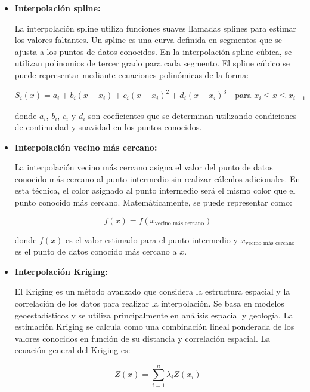 \documentclass{article}
\begin{document}
\begin{itemize}
\begin{itemize}
\item   \textbf{Interpolación spline:}

La interpolación spline utiliza funciones suaves llamadas splines para estimar los valores faltantes. Un spline es una curva definida en segmentos que se ajusta a los puntos de datos conocidos. En la interpolación spline cúbica, se utilizan polinomios de tercer grado para cada segmento. El spline cúbico se puede representar mediante ecuaciones polinómicas de la forma:

\begin{equation}
    S_i(x) = a_i + b_i(x - x_i) + c_i(x - x_i)^2 + d_i(x - x_i)^3 \quad \textrm{para } x_i \leq x \leq x_{i+1}
\end{equation}

donde $a_i$, $b_i$, $c_i$ y $d_i$ son coeficientes que se determinan utilizando condiciones de continuidad y suavidad en los puntos conocidos.

\item  \textbf{ Interpolación vecino más cercano:}

La interpolación vecino más cercano asigna el valor del punto de datos conocido más cercano al punto intermedio sin realizar cálculos adicionales. En esta técnica, el color asignado al punto intermedio será el mismo color que el punto conocido más cercano. Matemáticamente, se puede representar como:

\begin{equation}
    f(x) = f(x_{\textrm{vecino más cercano}})
\end{equation}

donde $f(x)$ es el valor estimado para el punto intermedio y $x_{\textrm{vecino más cercano}}$ es el punto de datos conocido más cercano a $x$.

\item   \textbf{Interpolación Kriging:}

El Kriging es un método avanzado que considera la estructura espacial y la correlación de los datos para realizar la interpolación. Se basa en modelos geoestadísticos y se utiliza principalmente en análisis espacial y geología. La estimación Kriging se calcula como una combinación lineal ponderada de los valores conocidos en función de su distancia y correlación espacial. La ecuación general del Kriging es:

\begin{equation}
    Z(x) = \sum_{i=1}^{n} \lambda_i Z(x_i)
\end{equation}


\end{itemize}
\end{itemize}
\end{document}
